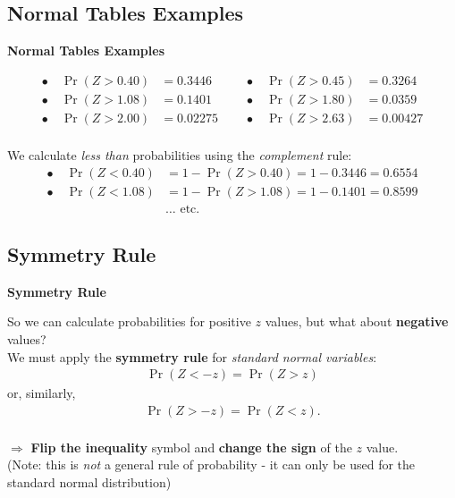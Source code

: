 \documentclass[compress]{beamer}        %
\makeatletter
\newcommand{\tcb}{\textcolor{beamer@blendedblue}}
\makeatother
\begin{document}
\subsection{Normal Tables Examples}
\begin{frame}{\bf \tcb{Normal Tables Examples}}

\begin{align*}
\bullet \quad \Pr(Z > 0.40) &= 0.3446 \qquad
&\bullet \quad\Pr(Z > 0.45) &= 0.3264\\[0.3cm]
\bullet \quad\Pr(Z > 1.08) &= 0.1401
&\bullet \quad\Pr(Z > 1.80) &= 0.0359\\[0.3cm]
\bullet \quad\Pr(Z > 2.00) &= 0.02275
&\bullet \quad\Pr(Z > 2.63) &= 0.00427\\[0.3cm]
\end{align*}

We calculate \emph{less than} probabilities using the \emph{complement} rule:
\begin{align*}
\bullet \quad \Pr(Z < 0.40) &= 1 - \Pr(Z > 0.40) = 1 - 0.3446 = 0.6554\\[0.3cm]
\bullet \quad \Pr(Z < 1.08) &= 1 - \Pr(Z > 1.08) = 1 - 0.1401 = 0.8599\\[0.3cm]
&\ldots \text{ etc.}
\end{align*}

\end{frame}



\subsection{Symmetry Rule}
\begin{frame}{\bf \tcb{Symmetry Rule}}

So we can calculate probabilities for positive $z$ values, but what about {\bf negative} values?\\[0.6cm]

We must apply the {\bf symmetry rule} for \emph{standard normal variables}:\\
\begin{align*}
\boxed{\Pr(Z < -z) = \Pr(Z > z)}
\end{align*}
or, similarly,\\[-0.5cm]
\begin{align*}
\boxed{\Pr(Z > -z) = \Pr(Z < z)}.\\
\end{align*}

$\Rightarrow$ {\bf Flip the inequality} symbol and {\bf change the sign} of the $z$ value.\\[0.4cm]

{\footnotesize(Note: this is \emph{not} a general rule of probability - it can only be used for the standard normal distribution)}

\end{frame}
\end{document}
